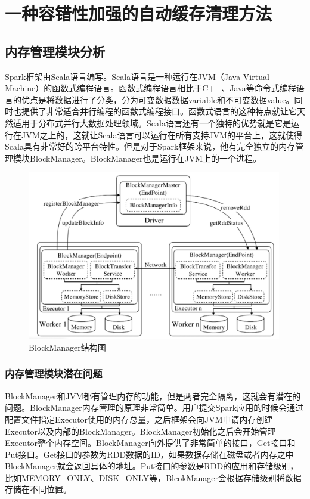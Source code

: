 \chapter{一种容错性加强的自动缓存清理方法}\label{chap:clean}

\section{内存管理模块分析}

Spark框架由Scala语言编写。Scala语言是一种运行在JVM（Java Virtual Machine）的函数式编程语言。函数式编程语言相比于C++、Java等命令式编程语言的优点是将数据进行了分类，分为可变数据数据variable和不可变数据value。同时也提供了非常适合并行编程的函数式编程接口。函数式语言的这种特点就让它天然适用于分布式并行大数据处理领域。Scala语言还有一个独特的优势就是它是运行在JVM之上的，这就让Scala语言可以运行在所有支持JVM的平台上，这就使得Scala具有非常好的跨平台特性。但是对于Spark框架来说，他有完全独立的内存管理模块BlockManager。BlockManager也是运行在JVM上的一个进程。

\begin{figure}
    \centering
    \includegraphics[width=0.99\textwidth]{Img/block-manager.jpg}
    \caption{BlockManager结构图}
    \label{fig:block-manager}
\end{figure}

\subsection{内存管理模块潜在问题}

BlockManager和JVM都有管理内存的功能，但是两者完全隔离，这就会有潜在的问题。BlockManager内存管理的原理非常简单。用户提交Spark应用的时候会通过配置文件指定Executor使用的内存总量，之后框架会向JVM申请内存创建Executor以及内部的BlockManager。BlockManager初始化之后会开始管理Executor整个内存空间。BlockManager向外提供了非常简单的接口，Get接口和Put接口。Get接口的参数为RDD数据的ID，如果数据存储在磁盘或者内存之中BlockManager就会返回具体的地址。Put接口的参数是RDD的应用和存储级别，比如MEMORY\_ONLY、DISK\_ONLY等，BlcokManager会根据存储级别将数据存储在不同位置。

